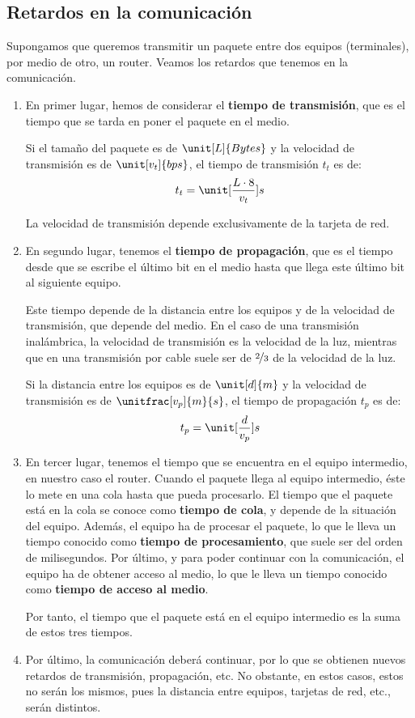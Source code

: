 \subsection{Retardos en la comunicación}
Supongamos que queremos transmitir un paquete entre dos equipos (terminales), por medio de otro, un router. Veamos los retardos que tenemos en la comunicación. 
\begin{enumerate}
    \item En primer lugar, hemos de considerar el \textbf{tiempo de transmisión}, que es el tiempo que se tarda en poner el paquete en el medio.
    
    Si el tamaño del paquete es de $\unit[L]{Bytes}$ y la velocidad de transmisión es de $\unit[v_t]{bps}$, el tiempo de transmisión $t_t$ es de:
    \begin{equation*}
        t_t = \unit[\frac{L\cdot 8}{v_t}]{s}
    \end{equation*}

    La velocidad de transmisión depende exclusivamente de la tarjeta de red.

    \item En segundo lugar, tenemos el \textbf{tiempo de propagación}, que es el tiempo desde que se escribe el último bit en el medio hasta que llega este último bit al siguiente equipo.
    
    Este tiempo depende de la distancia entre los equipos y de la velocidad de transmisión, que depende del medio. En el caso de una transmisión inalámbrica, la velocidad de transmisión es la velocidad de la luz, mientras que en una transmisión por cable suele ser de $\nicefrac{2}{3}$ de la velocidad de la luz.

    Si la distancia entre los equipos es de $\unit[d]{m}$ y la velocidad de transmisión es de $\unitfrac[v_p]{m}{s}$, el tiempo de propagación $t_p$ es de:
    \begin{equation*}
        t_p = \unit[\frac{d}{v_p}]{s}
    \end{equation*}

    \item En tercer lugar, tenemos el tiempo que se encuentra en el equipo intermedio, en nuestro caso el router. Cuando el paquete llega al equipo intermedio, éste lo mete en una cola hasta que pueda procesarlo. El tiempo que el paquete está en la cola se conoce como \textbf{tiempo de cola}, y depende de la situación del equipo. Además, el equipo ha de procesar el paquete, lo que le lleva un tiempo conocido como \textbf{tiempo de procesamiento}, que suele ser del orden de milisegundos. Por último, y para poder continuar con la comunicación, el equipo ha de obtener acceso al medio, lo que le lleva un tiempo conocido como \textbf{tiempo de acceso al medio}.
    
    Por tanto, el tiempo que el paquete está en el equipo intermedio es la suma de estos tres tiempos.

    \item Por último, la comunicación deberá continuar, por lo que se obtienen nuevos retardos de transmisión, propagación, etc. No obstante, en estos casos, estos no serán los mismos, pues la distancia entre equipos, tarjetas de red, etc., serán distintos.
\end{enumerate}

